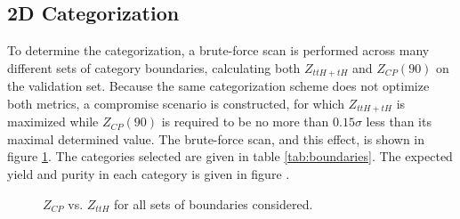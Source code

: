 \subsection{2D Categorization}

To determine the categorization, a brute-force scan is performed across many different sets of category boundaries, calculating both $Z_{ttH+tH}$ and $Z_{CP}(90)$ on the validation set. Because the same categorization scheme does not optimize both metrics, a compromise scenario is constructed, for which $Z_{ttH+tH}$ is maximized while $Z_{CP}(90)$ is required to be no more than $0.15\sigma$ less than its maximal determined value. The brute-force scan, and this effect, is shown in figure \ref{fig:optimal}. The categories selected are given in table \ref{tab:boundaries}. The expected yield and purity in each category is given in figure .

\begin{figure}[htbp]
 \centering
  \caption{$Z_{CP}$ vs. $Z_{ttH}$ for all sets of boundaries considered.}
  \label{fig:optimal}
\end{figure}

